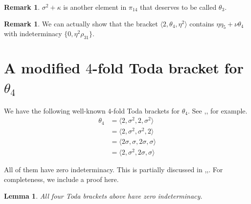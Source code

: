 \documentclass[psamsfonts]{amsart}
\newtheorem{lem}[thm]{Lemma}
\theoremstyle{definition}
\newtheorem{rem}[thm]{Remark}
\numberwithin{equation}{section}
\begin{document}
\begin{rem}
$\sigma^2+\kappa$ is another element in $\pi_{14}$ that deserves to be called $\theta_3$.
\end{rem}

\begin{rem}
We can actually show that the bracket $\langle 2, \theta_4, \eta^2\rangle$ contains $\eta\eta_5+\nu\theta_4$ with indeterminacy $\{0, \eta^2\rho_{31}\}$.
\end{rem}

\section{A modified $4$-fold Toda bracket for $\theta_4$}

We have the following well-known $4$-fold Toda brackets for $\theta_4$. See \cite{BMT},\cite{Ko},\cite{Ko2} for example.
\begin{equation*}
\begin{split}
\theta_4 & = \langle 2, \sigma^2, 2, \sigma^2 \rangle \\
& = \langle 2, \sigma^2, \sigma^2, 2 \rangle \\
& = \langle 2\sigma, \sigma, 2\sigma, \sigma \rangle \\
& = \langle 2, \sigma^2, 2 \sigma, \sigma \rangle
\end{split}
\end{equation*}

All of them have zero indeterminacy. This is partially discussed in \cite{BMT},\cite{Ko},\cite{Ko2}. For completeness, we include a proof here.

\begin{lem}
All four Toda brackets above have zero indeterminacy.
\end{lem}
\end{document}
